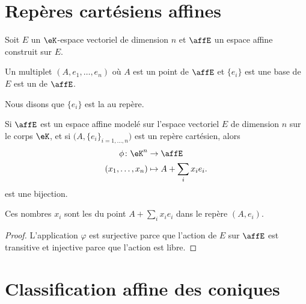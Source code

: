 \section{Repères cartésiens affines}

Soit \( E\) un \( \eK\)-espace vectoriel de dimension \( n\) et \( \affE\) un espace affine construit sur \( E\).
\begin{definition}      \label{DEFooQELZooEXvxgw}
	Un multiplet \( (A,e_1,\ldots, e_n)\) où \( A\) est un point de \( \affE\) et \( \{ e_i \}\) est une base de \( E\) est un  de \( \affE\).

	Nous disons que \( \{ e_i \}\) est la  au repère.
\end{definition}

\begin{proposition}
	Si \( \affE\) est un espace affine modelé sur l'espace vectoriel \( E\) de dimension \( n\) sur le corps \( \eK\), et si \(  \big( A,\{ e_i \}_{i=1,\ldots, n} \big)\) est un repère cartésien, alors
	\begin{equation}
		\begin{aligned}
			\phi\colon \eK^n  & \to \affE               \\
			(x_1,\ldots, x_n) & \mapsto A+\sum_ix_ie_i.
		\end{aligned}
	\end{equation}
	est une bijection.

	Ces nombres \( x_i\) sont les  du point \( A+\sum_ix_ie_i\) dans le repère \( (A,e_i)\).
\end{proposition}

\begin{proof}
	L'application \( \varphi\) est surjective parce que l'action de \( E\) sur \( \affE\) est transitive et injective parce que l'action est libre.
\end{proof}

\section{Classification affine des coniques}

